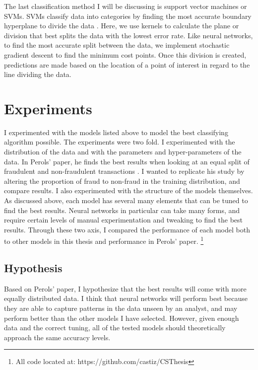 \documentclass[midd]{thesis}
\begin{document}
The last classification method I will be discussing is support vector machines or SVMs. SVMs classify data into categories by finding the most accurate boundary hyperplane to divide the data \cite{Brownlee}. Here, we use kernels to calculate the plane or division that best splits the data with the lowest error rate. Like neural networks, to find the most accurate split between the data, we implement stochastic gradient descent to find the minimum cost points. Once this division is created, predictions are made based on the location of a point of interest in regard to the line dividing the data. 

\section{Experiments}

I experimented with the models listed above to model the best classifying algorithm possible. The experiments were two fold. I experimented with the distribution of the data and with the parameters and hyper-parameters of the data. In Perols' paper, he finds the best results when looking at an equal split of fraudulent and non-fraudulent transactions \cite{Perols2011}. I wanted to replicate his study by altering the proportion of fraud to non-fraud in the training distribution, and compare results. I also experimented with the structure of the models themselves. As discussed above, each model has several many elements that can be tuned to find the best results. Neural networks in particular can take many forms, and require certain levels of manual experimentation and tweaking to find the best results. Through these two axis, I compared the performance of each model both to other models in this thesis and performance in Perols' paper. \footnote{All code located at: https://github.com/castiz/CSThesis}  


\subsection{Hypothesis}

Based on Perols' paper, I hypothesize that the best results will come with more equally distributed data. I think that neural networks will perform best because they are able to capture patterns in the data unseen by an analyst, and may perform better than the other models I have selected. However, given enough data and the correct tuning, all of the tested models should theoretically approach the same accuracy levels. 
\end{document}
